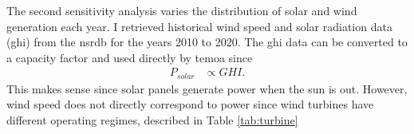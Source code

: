 The second sensitivity analysis varies the distribution of solar and wind generation
each year. I retrieved historical wind speed and solar radiation data (\gls{ghi})
from the \gls{nsrdb} \cite{sengupta_national_2018} for the years 2010 to 2020.
The \gls{ghi} data can be converted to a capacity factor and used directly by
\gls{temoa} since
\begin{align}
  P_{solar} &\propto GHI.
\end{align}
This makes sense since solar panels generate power when the sun is out. However,
wind speed does not directly correspond to power since wind turbines have different
operating regimes, described in Table \ref{tab:turbine}

\begin{table}[H]
  \centering
  \caption{Summary of Wind Turbine Data}
  \label{tab:turbine}

\end{table}

